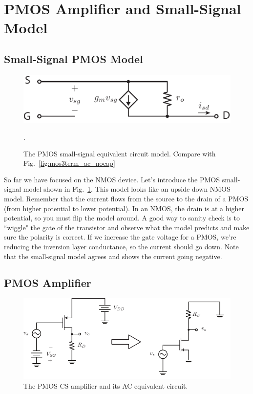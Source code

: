 \section{PMOS Amplifier and Small-Signal Model}




\subsection{Small-Signal PMOS Model}

\begin{figure}[tb]
\begin{center}
\includegraphics[scale=1]{pmos3term_dc}
\end{center}
\caption{The PMOS small-signal equivalent circuit model.  Compare with Fig.~\ref{fig:mos3term_ac_nocap}}. \label{fig:pmos3term_dc}
\end{figure}

So far we have focused on the NMOS device. Let's introduce the PMOS small-signal model shown in Fig.~\ref{fig:pmos3term_dc}.  This model looks like an upside down NMOS model.  Remember that the current flows from the source to the drain of a PMOS (from higher potential to lower potential).  In an NMOS, the drain is at a higher potential, so you must flip the model around.   A good way to sanity check is to ``wiggle" the gate of the transistor and observe what the model predicts and make sure the polarity is correct.  If we increase the gate voltage for a PMOS, we're reducing the inversion layer conductance, so the current should go down. Note that the small-signal model agrees and shows the current going negative.



\subsection{PMOS Amplifier}

\begin{figure}[tb]
\begin{center}
\includegraphics[scale=1]{cs_amp_pmos_ss1}
\end{center}
\caption{The PMOS CS amplifier and its AC equivalent circuit.} \label{fig:cs_amp_pmos_ss1}
\end{figure}


